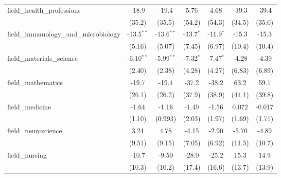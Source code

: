 \begin{tabular}{lcccccc}
   field\_health\_professions                                  & -18.9         & -19.4         & 5.76           & 4.68          & -39.3         & -39.4\\   
                                                               & (35.2)        & (35.5)        & (54.2)         & (54.3)        & (34.5)        & (35.0)\\   
   field\_immunology\_and\_microbiology                        & -13.5$^{**}$  & -13.6$^{**}$  & -13.7$^{*}$    & -11.9$^{*}$   & -15.3         & -15.3\\   
                                                               & (5.16)        & (5.07)        & (7.45)         & (6.97)        & (10.4)        & (10.4)\\   
   field\_materials\_science                                   & -6.10$^{**}$  & -5.99$^{**}$  & -7.32$^{*}$    & -7.47$^{*}$   & -4.28         & -4.39\\   
                                                               & (2.40)        & (2.38)        & (4.28)         & (4.27)        & (6.83)        & (6.89)\\   
   field\_mathematics                                          & -19.7         & -19.4         & -37.2          & -38.2         & 63.2          & 59.1\\   
                                                               & (26.1)        & (26.2)        & (37.9)         & (38.9)        & (44.1)        & (39.8)\\   
   field\_medicine                                             & -1.64         & -1.16         & -1.49          & -1.56         & 0.072         & -0.017\\   
                                                               & (1.10)        & (0.993)       & (2.03)         & (1.97)        & (1.69)        & (1.71)\\   
   field\_neuroscience                                         & 3.24          & 4.78          & -4.15          & -2.90         & -5.70         & -4.89\\   
                                                               & (9.51)        & (9.15)        & (7.05)         & (6.92)        & (11.5)        & (10.7)\\   
   field\_nursing                                              & -10.7         & -9.50         & -28.0          & -25.2         & 15.3          & 14.9\\   
                                                               & (10.3)        & (10.2)        & (17.4)         & (16.6)        & (13.7)        & (13.9)\\   

\end{tabular}
